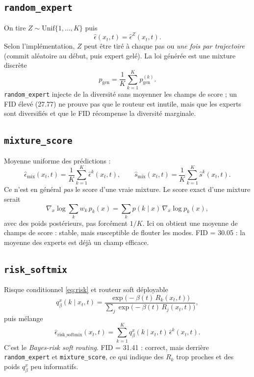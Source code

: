 \documentclass[11pt,a4paper]{article}
\newcommand{\epshat}{\hat{\epsilon}}
\newcommand{\shat}{\hat{s}}
\newcommand{\Rk}{R_k}
\begin{document}
\subsection{\texttt{random\_expert}}

On tire $Z \sim \mathrm{Unif}\{1,\ldots,K\}$ puis
\[
\epshat(x_t,t) = \epshat^Z(x_t,t).
\]
Selon l'implémentation, $Z$ peut être tiré à chaque pas ou \emph{une fois par trajectoire}
(commit aléatoire au début, puis expert gelé).
La loi générée est une mixture discrète
\[
p_{\mathrm{gen}} = \frac{1}{K}\sum_{k=1}^{K} p_{\mathrm{gen}}^{(k)}.
\]
\texttt{random\_expert} injecte de la diversité sans moyenner les champs de score ;
un FID élevé (27.77) ne prouve pas que le routeur est inutile, mais que les experts sont diversifiés
et que le FID récompense la diversité marginale.

\subsection{\texttt{mixture\_score}}

Moyenne uniforme des prédictions :
\[
\epshat_{\mathrm{mix}}(x_t,t)
= \frac{1}{K}\sum_{k=1}^{K}\epshat^k(x_t,t),
\qquad
\shat_{\mathrm{mix}}(x_t,t)
= \frac{1}{K}\sum_{k=1}^{K}\shat^k(x_t,t).
\]
Ce n'est en général \emph{pas} le score d'une vraie mixture.
Le score exact d'une mixture serait
\[
\nabla_x \log\sum_k w_k\, p_k(x)
= \sum_k p(k\mid x)\,\nabla_x\log p_k(x),
\]
avec des poids postérieurs, pas forcément $1/K$.
Ici on obtient une moyenne de champs de score : stable, mais susceptible de flouter les modes.
FID = 30.05 : la moyenne des experts est déjà un champ efficace.

\subsection{\texttt{risk\_softmix}}

Risque conditionnel \eqref{eq:risk} et routeur soft déployable
\begin{equation}
q_\beta^{x}(k \mid x_t,t)
= \frac{\exp\bigl(-\beta(t)\,\Rk(x_t,t)\bigr)}
{\sum_{j}\exp\bigl(-\beta(t)\,R_j(x_t,t)\bigr)},
\label{eq:softrouter}
\end{equation}
puis mélange
\[
\epshat_{\mathrm{risk\_softmix}}(x_t,t)
= \sum_{k=1}^{K} q_\beta^{x}(k \mid x_t,t)\,\epshat^k(x_t,t).
\]
C'est le \emph{Bayes-risk soft routing}.
FID = 31.41 : correct, mais derrière \texttt{random\_expert} et \texttt{mixture\_score},
ce qui indique des $\Rk$ trop proches et des poids $q_\beta^{x}$ peu informatifs.
\end{document}
